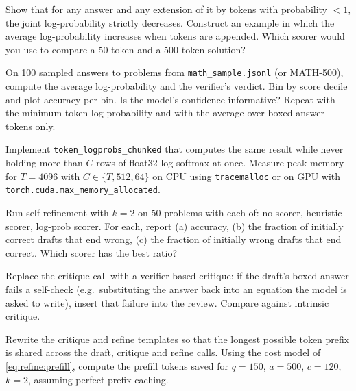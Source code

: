 \begin{exercise}
Show that for any answer and any extension of it by tokens with probability $< 1$, the joint
log-probability strictly decreases. Construct an example in which the average log-probability
increases when tokens are appended. Which scorer would you use to compare a 50-token and a 500-token
solution?
\end{exercise}

\begin{exercise}[calibration]\label{ex:refine:calib}
On 100 sampled answers to problems from \texttt{math\_sample.jsonl} (or MATH-500), compute the average
log-probability and the verifier's verdict. Bin by score decile and plot accuracy per bin. Is the
model's confidence informative? Repeat with the minimum token log-probability and with the
average over boxed-answer tokens only.
\end{exercise}

\begin{exercise}
Implement \texttt{token\_logprobs\_chunked} that computes the same result while never holding more
than $C$ rows of float32 log-softmax at once. Measure peak memory for $T = 4096$ with $C \in \{T, 512,
64\}$ on CPU using \texttt{tracemalloc} or on GPU with \texttt{torch.cuda.max\_memory\_allocated}.
\end{exercise}

\begin{exercise}
Run self-refinement with $k=2$ on 50 problems with each of: no scorer, heuristic scorer, log-prob
scorer. For each, report (a) accuracy, (b) the fraction of initially correct drafts that end wrong,
(c) the fraction of initially wrong drafts that end correct. Which scorer has the best ratio?
\end{exercise}

\begin{exercise}
Replace the critique call with a verifier-based critique: if the draft's boxed answer fails a
self-check (e.g.\ substituting the answer back into an equation the model is asked to write), insert
that failure into the review. Compare against intrinsic critique.
\end{exercise}

\begin{exercise}
Rewrite the critique and refine templates so that the longest possible token prefix is shared across
the draft, critique and refine calls. Using the cost model of \cref{eq:refine:prefill}, compute the
prefill tokens saved for $q=150$, $a=500$, $c=120$, $k=2$, assuming perfect prefix caching.
\end{exercise}

